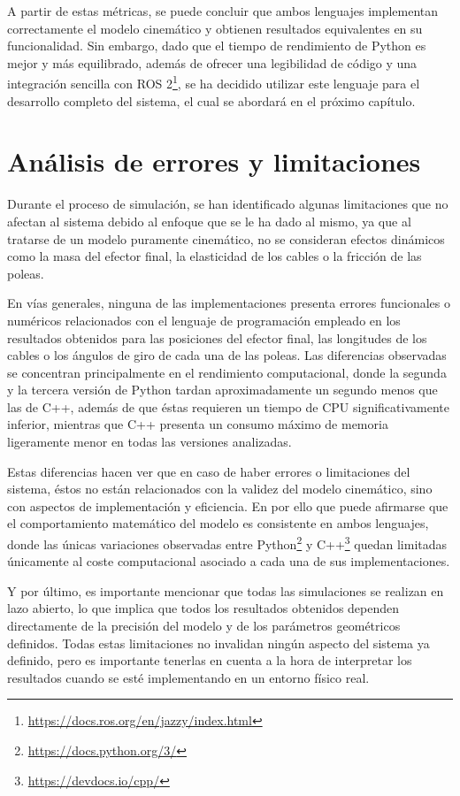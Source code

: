 \vspace{0.25cm}

A partir de estas métricas, se puede concluir que ambos lenguajes implementan correctamente el modelo cinemático y obtienen resultados equivalentes en su funcionalidad. Sin embargo, dado que el tiempo de rendimiento de Python es mejor y más equilibrado, además de ofrecer una legibilidad de código y una integración sencilla con ROS 2\footnote{\url{https://docs.ros.org/en/jazzy/index.html}}, se ha decidido utilizar este lenguaje para el desarrollo completo del sistema, el cual se abordará en el próximo capítulo.

\section{Análisis de errores y limitaciones}
\label{sec:segundaseccion}

Durante el proceso de simulación, se han identificado algunas limitaciones que no afectan al sistema debido al enfoque que se le ha dado al mismo, ya que al tratarse de un modelo puramente cinemático, no se consideran efectos dinámicos como la masa del efector final, la elasticidad de los cables o la fricción de las poleas.

\vspace{0.25cm}

En vías generales, ninguna de las implementaciones presenta errores funcionales o numéricos relacionados con el lenguaje de programación empleado en los resultados obtenidos para las posiciones del efector final, las longitudes de los cables o los ángulos de giro de cada una de las poleas. Las diferencias observadas se concentran principalmente en el rendimiento computacional, donde la segunda y la tercera versión de Python tardan aproximadamente un segundo menos que las de C++, además de que éstas requieren un tiempo de CPU significativamente inferior, mientras que C++ presenta un consumo máximo de memoria ligeramente menor en todas las versiones analizadas.

\newpage

Estas diferencias hacen ver que en caso de haber errores o limitaciones del sistema, éstos no están relacionados con la validez del modelo cinemático, sino con aspectos de implementación y eficiencia. En por ello que puede afirmarse que el comportamiento matemático del modelo es consistente en ambos lenguajes, donde las únicas variaciones observadas entre Python\footnote{\url{https://docs.python.org/3/}} y C++\footnote{\url{https://devdocs.io/cpp/}} quedan limitadas únicamente al coste computacional asociado a cada una de sus implementaciones.

\vspace{0.25cm}

Y por último, es importante mencionar que todas las simulaciones se realizan en lazo abierto, lo que implica que todos los resultados obtenidos dependen directamente de la precisión del modelo y de los parámetros geométricos definidos. Todas estas limitaciones no invalidan ningún aspecto del sistema ya definido, pero es importante tenerlas en cuenta a la hora de interpretar los resultados cuando se esté implementando en un entorno físico real.
